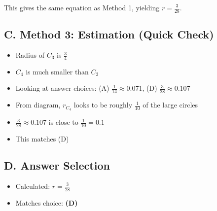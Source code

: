 \documentclass[11pt]{article}
\begin{document}
\begin{conversionbox}
This gives the same equation as Method 1, yielding $r = \frac{3}{28}$.

\subsection*{C. Method 3: Estimation (Quick Check)}

\begin{itemize}
    \item Radius of $C_3$ is $\frac{3}{4}$
    \item $C_4$ is much smaller than $C_3$
    \item Looking at answer choices: (A) $\frac{1}{14} \approx 0.071$, (D) $\frac{3}{28} \approx 0.107$
    \item From diagram, $r_{C_4}$ looks to be roughly $\frac{1}{10}$ of the large circles
    \item $\frac{3}{28} \approx 0.107$ is close to $\frac{1}{10} = 0.1$
    \item This matches (D)
\end{itemize}

\subsection*{D. Answer Selection}
\begin{itemize}
    \item Calculated: $r = \frac{3}{28}$
    \item Matches choice: \textbf{(D)}
\end{itemize}
\end{conversionbox}
\end{document}
